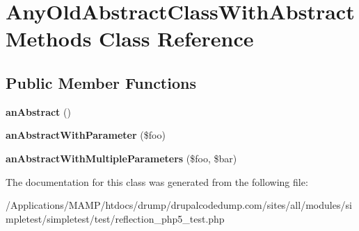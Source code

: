 \hypertarget{class_any_old_abstract_class_with_abstract_methods}{
\section{AnyOldAbstractClassWithAbstractMethods Class Reference}
\label{class_any_old_abstract_class_with_abstract_methods}
}
\subsection*{Public Member Functions}
\begin{DoxyCompactItemize}
\item 
\hypertarget{class_any_old_abstract_class_with_abstract_methods_a1c9cdb16b01b1661e6f78434c4d92a9b}{
{\bfseries anAbstract} ()}
\label{class_any_old_abstract_class_with_abstract_methods_a1c9cdb16b01b1661e6f78434c4d92a9b}

\item 
\hypertarget{class_any_old_abstract_class_with_abstract_methods_a2669fba10515b9732db5334b6e127563}{
{\bfseries anAbstractWithParameter} (\$foo)}
\label{class_any_old_abstract_class_with_abstract_methods_a2669fba10515b9732db5334b6e127563}

\item 
\hypertarget{class_any_old_abstract_class_with_abstract_methods_a555debaf6c38f11d4b2a002e21f243a3}{
{\bfseries anAbstractWithMultipleParameters} (\$foo, \$bar)}
\label{class_any_old_abstract_class_with_abstract_methods_a555debaf6c38f11d4b2a002e21f243a3}

\end{DoxyCompactItemize}


The documentation for this class was generated from the following file:\begin{DoxyCompactItemize}
\item 
/Applications/MAMP/htdocs/drump/drupalcodedump.com/sites/all/modules/simpletest/simpletest/test/reflection\_\-php5\_\-test.php\end{DoxyCompactItemize}
